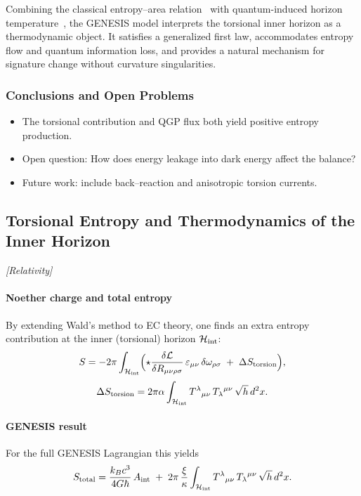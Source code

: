 \documentclass{article}
\newcommand{\grtag}{\textcolor{blue!40!black}{\textit{[Relativity]}}}
\begin{document}
Combining the classical entropy–area relation~\cite{bekenstein1973,bekenstein1974} with quantum-induced horizon temperature~\cite{hawking1975}, the GENESIS model interprets the torsional inner horizon as a thermodynamic object.
It satisfies a generalized first law, accommodates entropy flow and quantum information loss, and provides a natural mechanism for signature change without curvature singularities.


\subsubsection{Conclusions and Open Problems}
\begin{itemize}
  \item The torsional contribution and QGP flux both yield positive entropy production.
  \item Open question: How does energy leakage into dark energy affect the balance?
  \item Future work: include back–reaction and anisotropic torsion currents.
\end{itemize}



\subsection{Torsional Entropy and Thermodynamics of the Inner Horizon}
\label{sec:inner-entropy}
\grtag

\paragraph{Noether charge and total entropy}
By extending Wald’s method to EC theory, one finds an extra entropy contribution at the inner (torsional) horizon $\mathcal H_{\rm int}$:
\begin{equation}\label{eq:auto58}
S
  = -2\pi\int_{\mathcal H_{\rm int}}
      \Bigl(
        \star\frac{\delta\mathcal L}{\delta R_{\mu\nu\rho\sigma}}
           \,\varepsilon_{\mu\nu}\,\delta\omega_{\rho\sigma}
      \;+\;\Delta S_{\rm torsion}
      \Bigr),
\end{equation}
\begin{equation}\label{eq:auto59}
\Delta S_{\rm torsion}
  = 2\pi\alpha\int_{\mathcal H_{\rm int}}
      T^\lambda{}_{\mu\nu}\,T_\lambda{}^{\mu\nu}\,\sqrt{h}\,d^2x.
\end{equation}

\paragraph{GENESIS result}
For the full GENESIS Lagrangian this yields
\begin{equation}\label{eq:auto60}
S_{\rm total}
  = \frac{k_Bc^3}{4G\hbar}\,A_{\rm int}
  \;+\;
  2\pi\,\frac{\xi}{\kappa}
  \int_{\mathcal H_{\rm int}}
  T^\lambda{}_{\mu\nu}\,T_\lambda{}^{\mu\nu}\,\sqrt{h}\,d^2x.
\end{equation}
\end{document}
